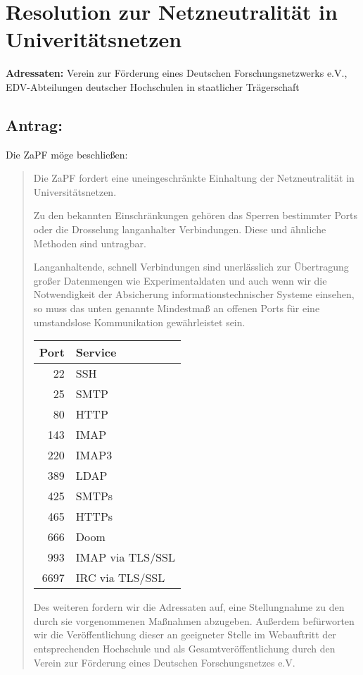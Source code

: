 \documentclass[12pt,oneside]{scrartcl}
\begin{document}
\section*{Resolution zur Netzneutralität in Univeritätsnetzen}

\textbf{Adressaten:} Verein zur Förderung eines Deutschen Forschungsnetzwerks e.V., EDV-Abteilungen deutscher Hochschulen in staatlicher Trägerschaft

\subsection*{Antrag:}
Die ZaPF möge beschließen:
\begin{quote}
Die ZaPF fordert eine uneingeschränkte Einhaltung der Netzneutralität in Universitätsnetzen.

Zu den bekannten Einschränkungen gehören das Sperren bestimmter Ports oder die
Drosselung langanhalter Verbindungen. Diese und ähnliche Methoden sind
untragbar.

Langanhaltende, schnell Verbindungen sind unerlässlich zur Übertragung großer
Datenmengen wie Experimentaldaten und auch wenn wir die Notwendigkeit der
Absicherung informationstechnischer Systeme einsehen, so muss das unten genannte Mindestmaß an offenen Ports für
eine umstandslose Kommunikation gewährleistet sein.

\vspace{0.5cm}
\begin{center}
\begin{tabular}{rl}
	\toprule
	Port & Service \\
	\midrule
	22 & SSH \\
	25 & SMTP \\
	80 & HTTP \\
	143 & IMAP \\
	220 & IMAP3 \\
	389 & LDAP \\
	425 & SMTPs \\
	465 & HTTPs \\
	666 & Doom \\
	993 & IMAP via TLS/SSL \\
	6697 & IRC via TLS/SSL \\
	\bottomrule
\end{tabular}
\end{center}
\vspace{0.5cm}
Des weiteren fordern wir die Adressaten auf, eine Stellungnahme zu den durch sie vorgenommenen Maßnahmen abzugeben. Außerdem befürworten wir die Veröffentlichung dieser an geeigneter Stelle im Webauftritt der entsprechenden Hochschule und als Gesamtveröffentlichung durch den Verein zur Förderung eines Deutschen Forschungsnetzes e.V.
\end{quote}
\end{document}
